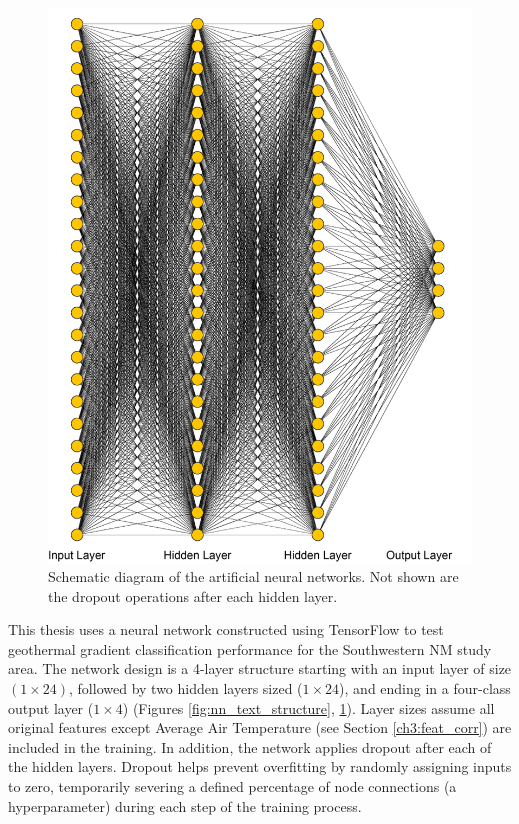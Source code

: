 \begin{figure}[!htp]
\begin{minipage}[b][][b]{.35\linewidth}
\end{minipage}
\hfill
\begin{minipage}[b][][b]{.61\linewidth}
    \includegraphics[width=\linewidth]{templates/images/Figure-ANN.png}
    \caption[Neural network structural schematic]{Schematic diagram of the artificial neural networks. Not shown are the dropout operations after each hidden layer.}
    \label{fig:nn_dot_structure}
\end{minipage}
\end{figure}

This thesis uses a neural network constructed using TensorFlow \citep{abadi_tensorflow_2016} to test geothermal gradient classification performance for the Southwestern NM study area. The network design is a 4-layer structure starting with an input layer of size \({(1\times24)}\), followed by two hidden layers sized ($1\times24$), and ending in a four-class output layer ($1\times4$) (Figures \ref{fig:nn_text_structure}, \ref{fig:nn_dot_structure}). Layer sizes assume all original features except Average Air Temperature (see Section \ref{ch3:feat_corr}) are included in the training. In addition, the network applies dropout after each of the hidden layers. Dropout helps prevent overfitting by randomly assigning inputs to zero, temporarily severing a defined percentage of node connections (a hyperparameter) during each step of the training process.

